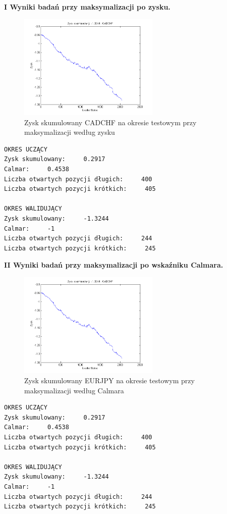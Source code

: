 \noindent \textbf{I Wyniki badań przy maksymalizacji po zysku.}\\
\begin{figure}[h!]
\centering
\includegraphics[width = 0.6\textwidth]{SS_CADCHF_S4LS_zysk.png}
\caption{Zysk skumulowany CADCHF na okresie testowym przy maksymalizacji według zysku}
\end{figure}
\FloatBarrier
\begin{verbatim}
OKRES UCZĄCY
Zysk skumulowany:     0.2917
Calmar:     0.4538
Liczba otwartych pozycji długich:     400
Liczba otwartych pozycji krótkich:     405

OKRES WALIDUJĄCY
Zysk skumulowany:     -1.3244
Calmar:     -1
Liczba otwartych pozycji długich:     244
Liczba otwartych pozycji krótkich:     245
\end{verbatim}
\newpage
\textbf{II Wyniki badań przy maksymalizacji po wskaźniku Calmara.}\\
\begin{figure}[h!]
\centering
\includegraphics[width = 0.6\textwidth]{SS_CADCHF_S4LS_calmar.png}
\caption{Zysk skumulowany EURJPY na okresie testowym przy maksymalizacji według Calmara}
\end{figure}
\FloatBarrier
\begin{verbatim}
OKRES UCZĄCY
Zysk skumulowany:     0.2917
Calmar:     0.4538
Liczba otwartych pozycji długich:     400
Liczba otwartych pozycji krótkich:     405

OKRES WALIDUJĄCY
Zysk skumulowany:     -1.3244
Calmar:     -1
Liczba otwartych pozycji długich:     244
Liczba otwartych pozycji krótkich:     245
\end{verbatim}
%
